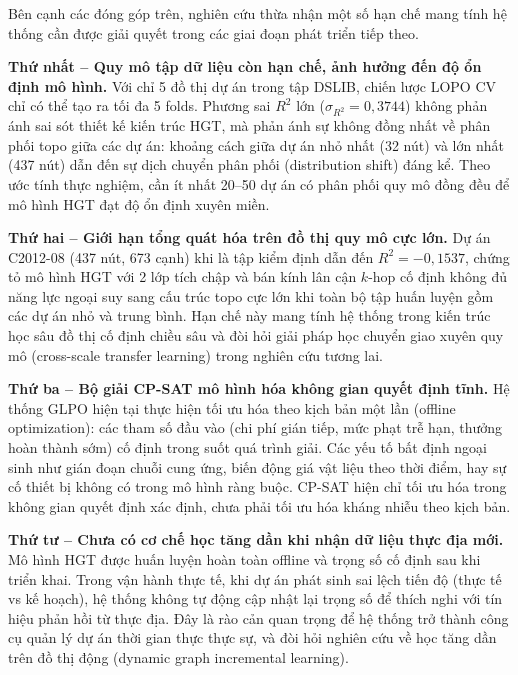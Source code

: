 Bên cạnh các đóng góp trên, nghiên cứu thừa nhận một số hạn chế mang tính hệ thống cần được giải quyết trong các giai đoạn phát triển tiếp theo.

\textbf{Thứ nhất -- Quy mô tập dữ liệu còn hạn chế, ảnh hưởng đến độ ổn định mô hình.}
Với chỉ 5 đồ thị dự án trong tập DSLIB, chiến lược LOPO CV chỉ có thể tạo ra tối đa 5 folds. Phương sai $R^2$ lớn ($\sigma_{R^2} = 0{,}3744$) không phản ánh sai sót thiết kế kiến trúc HGT, mà phản ánh sự không đồng nhất về phân phối topo giữa các dự án: khoảng cách giữa dự án nhỏ nhất (32 nút) và lớn nhất (437 nút) dẫn đến sự dịch chuyển phân phối (distribution shift) đáng kể. Theo ước tính thực nghiệm, cần ít nhất 20--50 dự án có phân phối quy mô đồng đều để mô hình HGT đạt độ ổn định xuyên miền.

\textbf{Thứ hai -- Giới hạn tổng quát hóa trên đồ thị quy mô cực lớn.}
Dự án C2012-08 (437 nút, 673 cạnh) khi là tập kiểm định dẫn đến $R^2 = -0{,}1537$, chứng tỏ mô hình HGT với 2 lớp tích chập và bán kính lân cận $k$-hop cố định không đủ năng lực ngoại suy sang cấu trúc topo cực lớn khi toàn bộ tập huấn luyện gồm các dự án nhỏ và trung bình. Hạn chế này mang tính hệ thống trong kiến trúc học sâu đồ thị cố định chiều sâu và đòi hỏi giải pháp học chuyển giao xuyên quy mô (cross-scale transfer learning) trong nghiên cứu tương lai.

\textbf{Thứ ba -- Bộ giải CP-SAT mô hình hóa không gian quyết định tĩnh.}
Hệ thống GLPO hiện tại thực hiện tối ưu hóa theo kịch bản một lần (offline optimization): các tham số đầu vào (chi phí gián tiếp, mức phạt trễ hạn, thưởng hoàn thành sớm) cố định trong suốt quá trình giải. Các yếu tố bất định ngoại sinh như gián đoạn chuỗi cung ứng, biến động giá vật liệu theo thời điểm, hay sự cố thiết bị không có trong mô hình ràng buộc. CP-SAT hiện chỉ tối ưu hóa trong không gian quyết định xác định, chưa phải tối ưu hóa kháng nhiễu theo kịch bản.

\textbf{Thứ tư -- Chưa có cơ chế học tăng dần khi nhận dữ liệu thực địa mới.}
Mô hình HGT được huấn luyện hoàn toàn offline và trọng số cố định sau khi triển khai. Trong vận hành thực tế, khi dự án phát sinh sai lệch tiến độ (thực tế vs kế hoạch), hệ thống không tự động cập nhật lại trọng số để thích nghi với tín hiệu phản hồi từ thực địa. Đây là rào cản quan trọng để hệ thống trở thành công cụ quản lý dự án thời gian thực thực sự, và đòi hỏi nghiên cứu về học tăng dần trên đồ thị động (dynamic graph incremental learning).

